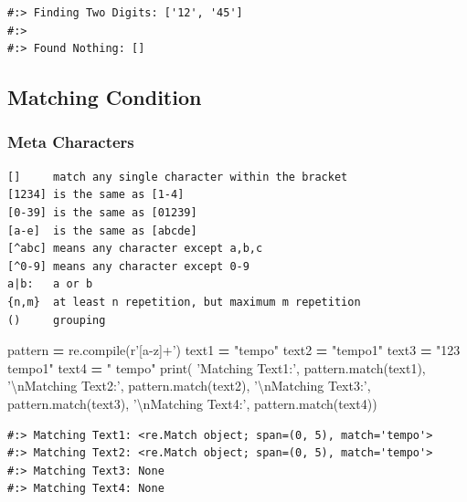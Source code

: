 \documentclass[
]{book}
\newenvironment{Shaded}{\begin{snugshade}}{\end{snugshade}}
\newcommand{\BuiltInTok}[1]{#1}
\newcommand{\CharTok}[1]{\textcolor[rgb]{0.5,0.5,0.5}{#1}}
\newcommand{\NormalTok}[1]{#1}
\newcommand{\OperatorTok}[1]{\textcolor[rgb]{0.43,0.43,0.43}{\textbf{#1}}}
\newcommand{\StringTok}[1]{\textcolor[rgb]{0.5,0.5,0.5}{#1}}
\newcommand{\VerbatimStringTok}[1]{\textcolor[rgb]{0.5,0.5,0.5}{#1}}
\begin{document}
\begin{verbatim}
#:> Finding Two Digits: ['12', '45'] 
#:>  
#:> Found Nothing: []
\end{verbatim}

\hypertarget{matching-condition}{%
\subsection{Matching Condition}\label{matching-condition}}

\hypertarget{meta-characters}{%
\subsubsection{Meta Characters}\label{meta-characters}}

\begin{verbatim}
[]     match any single character within the bracket
[1234] is the same as [1-4]
[0-39] is the same as [01239]
[a-e]  is the same as [abcde]
[^abc] means any character except a,b,c
[^0-9] means any character except 0-9
a|b:   a or b
{n,m}  at least n repetition, but maximum m repetition
()     grouping
\end{verbatim}

\begin{Shaded}
\begin{Highlighting}[]
\NormalTok{pattern }\OperatorTok{=}\NormalTok{ re.}\BuiltInTok{compile}\NormalTok{(}\VerbatimStringTok{r'[a-z]+'}\NormalTok{)}
\NormalTok{text1 }\OperatorTok{=} \StringTok{"tempo"}
\NormalTok{text2 }\OperatorTok{=} \StringTok{"tempo1"}
\NormalTok{text3 }\OperatorTok{=} \StringTok{"123 tempo1"}
\NormalTok{text4 }\OperatorTok{=} \StringTok{" tempo"}
\BuiltInTok{print}\NormalTok{(}
  \StringTok{'Matching Text1:'}\NormalTok{, pattern.match(text1),}
  \StringTok{'}\CharTok{\textbackslash{}n}\StringTok{Matching Text2:'}\NormalTok{, pattern.match(text2),}
  \StringTok{'}\CharTok{\textbackslash{}n}\StringTok{Matching Text3:'}\NormalTok{, pattern.match(text3),}
  \StringTok{'}\CharTok{\textbackslash{}n}\StringTok{Matching Text4:'}\NormalTok{, pattern.match(text4))}
\end{Highlighting}
\end{Shaded}

\begin{verbatim}
#:> Matching Text1: <re.Match object; span=(0, 5), match='tempo'> 
#:> Matching Text2: <re.Match object; span=(0, 5), match='tempo'> 
#:> Matching Text3: None 
#:> Matching Text4: None
\end{verbatim}
\end{document}
